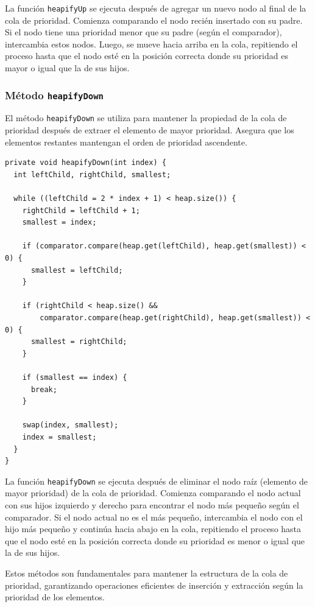 \documentclass[10pt, a4paper]{article}
\newcommand{\mj}[1]{\texttt{#1}}
\begin{document}
La función \mj{heapifyUp} se ejecuta después de agregar un nuevo nodo al final de la cola de prioridad. Comienza comparando el nodo recién insertado con su padre. Si el nodo tiene una prioridad menor que su padre (según el comparador), intercambia estos nodos. Luego, se mueve hacia arriba en la cola, repitiendo el proceso hasta que el nodo esté en la posición correcta donde su prioridad es mayor o igual que la de sus hijos.

\subsubsection{Método \mj{heapifyDown}}

El método \mj{heapifyDown} se utiliza para mantener la propiedad de la cola de prioridad después de extraer el elemento de mayor prioridad. Asegura que los elementos restantes mantengan el orden de prioridad ascendente.

\begin{verbatim}
private void heapifyDown(int index) {
  int leftChild, rightChild, smallest;

  while ((leftChild = 2 * index + 1) < heap.size()) {
    rightChild = leftChild + 1;
    smallest = index;

    if (comparator.compare(heap.get(leftChild), heap.get(smallest)) < 0) {
      smallest = leftChild;
    }

    if (rightChild < heap.size() &&
        comparator.compare(heap.get(rightChild), heap.get(smallest)) < 0) {
      smallest = rightChild;
    }

    if (smallest == index) {
      break;
    }

    swap(index, smallest);
    index = smallest;
  }
}
\end{verbatim}

La función \mj{heapifyDown} se ejecuta después de eliminar el nodo raíz (elemento de mayor prioridad) de la cola de prioridad. Comienza comparando el nodo actual con sus hijos izquierdo y derecho para encontrar el nodo más pequeño según el comparador. Si el nodo actual no es el más pequeño, intercambia el nodo con el hijo más pequeño y continúa hacia abajo en la cola, repitiendo el proceso hasta que el nodo esté en la posición correcta donde su prioridad es menor o igual que la de sus hijos.

Estos métodos son fundamentales para mantener la estructura de la cola de prioridad, garantizando operaciones eficientes de inserción y extracción según la prioridad de los elementos.
\end{document}
